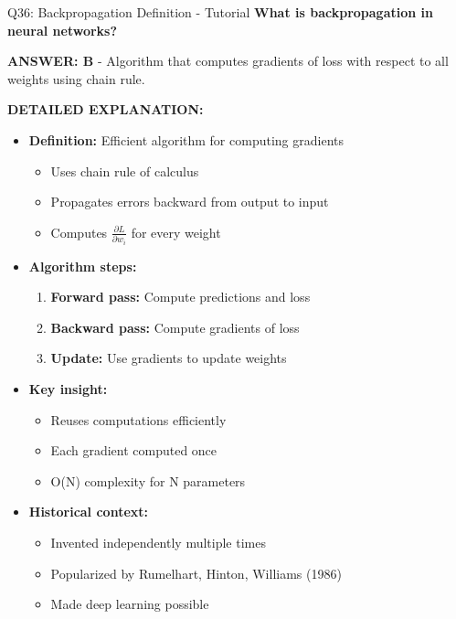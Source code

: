 \documentclass[8pt]{beamer}
\begin{document}
	\begin{frame}{Q36: Backpropagation Definition - Tutorial}
		\fontsize{6.5}{7.5}\selectfont
		\textbf{What is backpropagation in neural networks?}
		
		\vspace{0.05cm}
		\textcolor{myblue}{\textbf{ANSWER: B}} - Algorithm that computes gradients of loss with respect to all weights using chain rule.
		
		\vspace{0.05cm}
		\textbf{DETAILED EXPLANATION:}
		\begin{itemize}
			\item \textbf{Definition:} Efficient algorithm for computing gradients
			\begin{itemize}
				\item Uses chain rule of calculus
				\item Propagates errors backward from output to input
				\item Computes $\frac{\partial L}{\partial w_i}$ for every weight
			\end{itemize}
			\item \textbf{Algorithm steps:}
			\begin{enumerate}
				\item \textbf{Forward pass:} Compute predictions and loss
				\item \textbf{Backward pass:} Compute gradients of loss
				\item \textbf{Update:} Use gradients to update weights
			\end{enumerate}
			\item \textbf{Key insight:}
			\begin{itemize}
				\item Reuses computations efficiently
				\item Each gradient computed once
				\item O(N) complexity for N parameters
			\end{itemize}
			\item \textbf{Historical context:}
			\begin{itemize}
				\item Invented independently multiple times
				\item Popularized by Rumelhart, Hinton, Williams (1986)
				\item Made deep learning possible
			\end{itemize}
		\end{itemize}
		

\end{frame}
\end{document}
